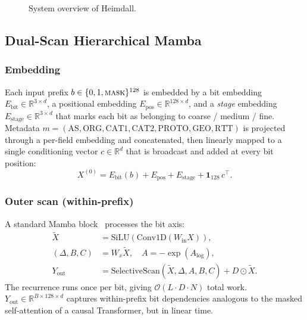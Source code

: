 \documentclass[conference]{IEEEtran}
\begin{document}
\begin{figure}[t]
  \centering
  \caption{System overview of Heimdall.}
  \label{fig:overview}
\end{figure}

\subsection{Dual-Scan Hierarchical Mamba}\label{sec:design-model}

\subsubsection{Embedding}
Each input prefix $b\in\{0,1,\textsc{mask}\}^{128}$ is embedded by a
bit embedding $E_{\mathrm{bit}}\in\mathbb{R}^{3\times d}$, a positional
embedding $E_{\mathrm{pos}}\in\mathbb{R}^{128\times d}$, and a
\emph{stage} embedding $E_{\mathrm{stage}}\in\mathbb{R}^{3\times d}$
that marks each bit as belonging to coarse / medium / fine.  Metadata
$m=(\text{AS},\text{ORG},\text{CAT1},\text{CAT2},\text{PROTO},
\text{GEO},\text{RTT})$ is projected through a per-field embedding and
concatenated, then linearly mapped to a single conditioning vector
$c\in\mathbb{R}^{d}$ that is broadcast and added at every bit position:
\begin{equation}
  X^{(0)} = E_{\mathrm{bit}}(b) + E_{\mathrm{pos}} + E_{\mathrm{stage}}
            + \mathbf{1}_{128}\,c^{\top}.
\end{equation}

\subsubsection{Outer scan (within-prefix)}
A standard Mamba block~\cite{gu2023mamba} processes the bit axis:
\begin{align}
  \tilde X &= \mathrm{SiLU}(\mathrm{Conv1D}(W_{\mathrm{in}} X)),\\
  (\Delta, B, C) &= W_{x}\tilde X,\quad
  A = -\exp(A_{\log}),\\
  Y_{\mathrm{out}} &= \mathrm{SelectiveScan}(\tilde X, \Delta, A, B, C)
       + D \odot \tilde X.
\end{align}
The recurrence runs once per bit, giving $\mathcal O(L\cdot D\cdot N)$
total work.  $Y_{\mathrm{out}}\in\mathbb{R}^{B\times128\times d}$
captures within-prefix bit dependencies analogous to the masked
self-attention of a causal Transformer, but in linear time.
\end{document}
